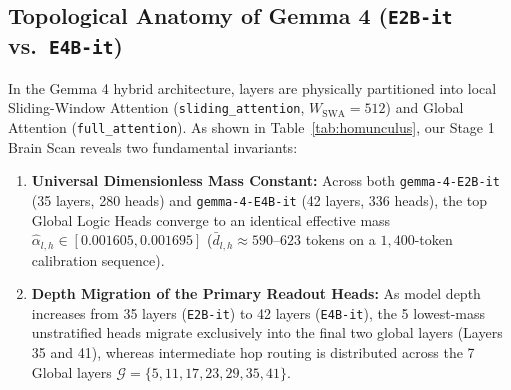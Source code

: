 \documentclass[11pt,letterpaper]{article}
\theoremstyle{definition}
\begin{document}
\subsection{Topological Anatomy of Gemma 4 (\texttt{E2B-it} vs.\ \texttt{E4B-it})}
In the Gemma 4 hybrid architecture, layers are physically partitioned into local Sliding-Window Attention (\texttt{sliding\_attention}, $W_{\text{SWA}} = 512$) and Global Attention (\texttt{full\_attention}). As shown in Table~\ref{tab:homunculus}, our Stage 1 Brain Scan reveals two fundamental invariants:
\begin{enumerate}
    \item \textbf{Universal Dimensionless Mass Constant:} Across both \texttt{gemma-4-E2B-it} (35 layers, 280 heads) and \texttt{gemma-4-E4B-it} (42 layers, 336 heads), the top Global Logic Heads converge to an identical effective mass $\hat{\alpha}_{l,h} \in [0.001605, 0.001695]$ ($\bar{d}_{l,h} \approx 590\text{--}623$ tokens on a $1,400$-token calibration sequence).
    \item \textbf{Depth Migration of the Primary Readout Heads:} As model depth increases from 35 layers (\texttt{E2B-it}) to 42 layers (\texttt{E4B-it}), the 5 lowest-mass unstratified heads migrate exclusively into the final two global layers (Layers 35 and 41), whereas intermediate hop routing is distributed across the 7 Global layers $\mathcal{G} = \{5, 11, 17, 23, 29, 35, 41\}$.
\end{enumerate}
\end{document}
